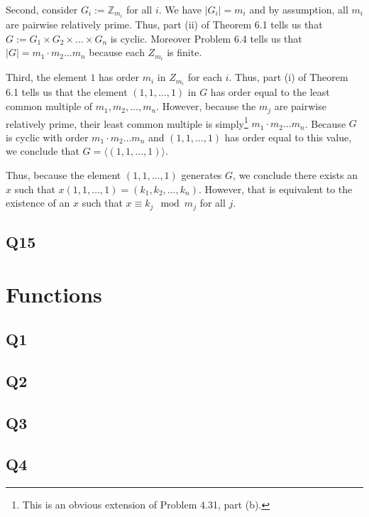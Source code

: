 \documentclass[12pt]{article}
\def\Z{{\mathbb Z}}        %
\numberwithin{theorem}{section}
\numberwithin{equation}{section}
\numberwithin{remark}{section}
\numberwithin{definition}{section}
\numberwithin{theorem}{section}
\numberwithin{lemma}{section}
\numberwithin{example}{section}
\begin{document}
Second, consider $G_i:=\Z_{m_i}$ for all $i$. We have $|G_i|=m_i$ and by assumption, all $m_i$ are pairwise relatively prime. Thus, part (ii) of Theorem 6.1 tells us that $G:=G_1\times G_2\times \ldots \times G_n$ is cyclic. Moreover Problem 6.4 tells us that $|G|=m_1\cdot m_2\dots m_n$ because each $Z_{m_i}$ is finite. 

Third, the element $1$ has order $m_i$ in $Z_{m_i}$ for each $i$. Thus, part (i) of Theorem 6.1 tells us that the element $(1,1,\ldots,1)$ in $G$ has order equal to the least common multiple of $m_1,m_2,\ldots, m_n$. However, because the $m_j$ are pairwise relatively prime, their least common multiple is simply\footnote{This is an obvious extension of Problem 4.31, part (b).} $m_1\cdot m_2  \dots  m_n$. Because $G$ is cyclic with order $m_1\cdot m_2  \dots  m_n$ and $(1,1,\ldots,1)$ has order equal to this value, we conclude that $G = \langle (1,1,\ldots,1) \rangle$. 

Thus, because the element $(1,1,\ldots,1)$ generates $G$, we conclude there exists an $x$ such that $x(1,1,\ldots,1) = (k_1,k_2,\ldots,k_n)$. However, that is equivalent to the existence of an $x$ such that $x\equiv k_j \mod{m_j}$ for all $j$. 



\subsection{Q15}

\newpage

\section{Functions}

\subsection{Q1}

\subsection{Q2}

\subsection{Q3}

\subsection{Q4}
\end{document}
